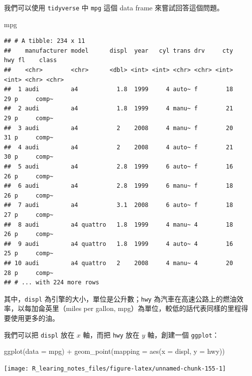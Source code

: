 \documentclass[
]{book}
\newenvironment{Shaded}{\begin{snugshade}}{\end{snugshade}}
\newcommand{\AttributeTok}[1]{\textcolor[rgb]{0.77,0.63,0.00}{#1}}
\newcommand{\FunctionTok}[1]{\textcolor[rgb]{0.00,0.00,0.00}{#1}}
\newcommand{\NormalTok}[1]{#1}
\newcommand{\SpecialCharTok}[1]{\textcolor[rgb]{0.00,0.00,0.00}{#1}}
\theoremstyle{definition}
\theoremstyle{remark}
\begin{document}
我們可以使用 \texttt{tidyverse} 中 \texttt{mpg} 這個 data frame 來嘗試回答這個問題。

\begin{Shaded}
\begin{Highlighting}[]
\NormalTok{mpg}
\end{Highlighting}
\end{Shaded}

\begin{verbatim}
## # A tibble: 234 x 11
##    manufacturer model      displ  year   cyl trans drv     cty   hwy fl    class
##    <chr>        <chr>      <dbl> <int> <int> <chr> <chr> <int> <int> <chr> <chr>
##  1 audi         a4           1.8  1999     4 auto~ f        18    29 p     comp~
##  2 audi         a4           1.8  1999     4 manu~ f        21    29 p     comp~
##  3 audi         a4           2    2008     4 manu~ f        20    31 p     comp~
##  4 audi         a4           2    2008     4 auto~ f        21    30 p     comp~
##  5 audi         a4           2.8  1999     6 auto~ f        16    26 p     comp~
##  6 audi         a4           2.8  1999     6 manu~ f        18    26 p     comp~
##  7 audi         a4           3.1  2008     6 auto~ f        18    27 p     comp~
##  8 audi         a4 quattro   1.8  1999     4 manu~ 4        18    26 p     comp~
##  9 audi         a4 quattro   1.8  1999     4 auto~ 4        16    25 p     comp~
## 10 audi         a4 quattro   2    2008     4 manu~ 4        20    28 p     comp~
## # ... with 224 more rows
\end{verbatim}

其中，\texttt{displ} 為引擎的大小，單位是公升數；\texttt{hwy} 為汽車在高速公路上的燃油效率，以每加侖英里（miles per gallon, mpg）為單位，較低的話代表同樣的里程得要使用更多的油。

我們可以把 \texttt{displ} 放在 \(x\) 軸，而把 \texttt{hwy} 放在 \(y\) 軸，創建一個 \texttt{ggplot}：

\begin{Shaded}
\begin{Highlighting}[]
\FunctionTok{ggplot}\NormalTok{(}\AttributeTok{data =}\NormalTok{ mpg) }\SpecialCharTok{+} \FunctionTok{geom\_point}\NormalTok{(}\AttributeTok{mapping =} \FunctionTok{aes}\NormalTok{(}\AttributeTok{x =}\NormalTok{ displ, }\AttributeTok{y =}\NormalTok{ hwy))}
\end{Highlighting}
\end{Shaded}

\begin{center}\texttt{[image: R\_learing\_notes\_files/figure-latex/unnamed-chunk-155-1]} \end{center}
\end{document}
